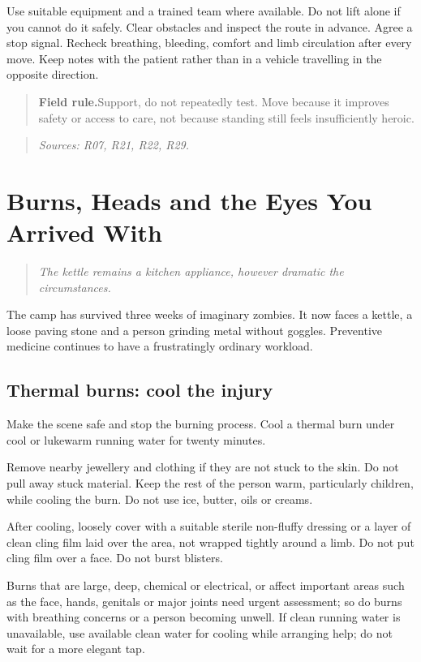 \documentclass[10pt,openright]{book}
\newcommand{\fieldrule}[1]{\begin{quote}\textbf{Field rule.}\enspace #1\end{quote}}
\begin{document}
Use suitable equipment and a trained team where available. Do not lift alone if you cannot do it safely. Clear obstacles and inspect the route in advance. Agree a stop signal. Recheck breathing, bleeding, comfort and limb circulation after every move. Keep notes with the patient rather than in a vehicle travelling in the opposite direction.

\fieldrule{Support, do not repeatedly test. Move because it improves safety or access to care, not because standing still feels insufficiently heroic.}
\begin{quote}\emph{Sources: R07, R21, R22, R29.}\end{quote}
\chapter{Burns, Heads and the Eyes You Arrived With}
\begin{quote}\emph{The kettle remains a kitchen appliance, however dramatic the circumstances.}\end{quote}
The camp has survived three weeks of imaginary zombies. It now faces a kettle, a loose paving stone and a person grinding metal without goggles. Preventive medicine continues to have a frustratingly ordinary workload.

\section*{Thermal burns: cool the injury}
Make the scene safe and stop the burning process. Cool a thermal burn under cool or lukewarm running water for twenty minutes.

Remove nearby jewellery and clothing if they are not stuck to the skin. Do not pull away stuck material. Keep the rest of the person warm, particularly children, while cooling the burn. Do not use ice, butter, oils or creams.

After cooling, loosely cover with a suitable sterile non-fluffy dressing or a layer of clean cling film laid over the area, not wrapped tightly around a limb. Do not put cling film over a face. Do not burst blisters.

Burns that are large, deep, chemical or electrical, or affect important areas such as the face, hands, genitals or major joints need urgent assessment; so do burns with breathing concerns or a person becoming unwell. If clean running water is unavailable, use available clean water for cooling while arranging help; do not wait for a more elegant tap.
\end{document}
